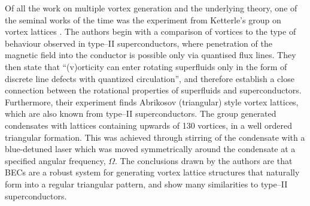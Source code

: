 
Of all the work on multiple vortex generation and the underlying theory, one of the seminal works of the time was the experiment from Ketterle's group on vortex lattices \cite{Vtx:AboShaeer_sci_2001}. The authors begin with a comparison of vortices to the type of behaviour observed in type--II superconductors, where penetration of the magnetic field into the conductor is possible only via quantised flux lines. They then state that ``(v)orticity can enter rotating superfluids only in the form of discrete line defects with quantized circulation'', and therefore establish a close connection between the rotational properties of superfluids and superconductors. Furthermore, their experiment finds Abrikosov (triangular) style vortex lattices, which are also known from type--II superconductors. The group generated condensates with lattices containing upwards of 130 vortices, in a well ordered triangular formation. This was achieved through stirring of the condensate with a blue-detuned laser which was moved symmetrically around the condensate at a specified angular frequency, $\Omega$. The conclusions drawn by the authors are that BECs are a robust system for generating vortex lattice structures that naturally form into a regular triangular pattern, and show many similarities to type--II superconductors.


